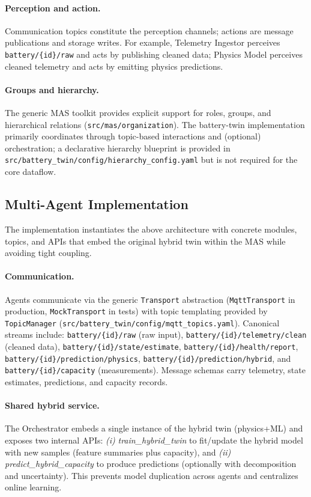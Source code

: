 \paragraph{Perception and action.} Communication topics constitute the perception channels; actions are message publications and storage writes. For example, Telemetry Ingestor perceives \texttt{battery/\{id\}/raw} and acts by publishing cleaned data; Physics Model perceives cleaned telemetry and acts by emitting physics predictions.

\paragraph{Groups and hierarchy.} The generic MAS toolkit provides explicit support for roles, groups, and hierarchical relations (\texttt{src/mas/organization}). The battery-twin implementation primarily coordinates through topic-based interactions and (optional) orchestration; a declarative hierarchy blueprint is provided in \texttt{src/battery\_twin/config/hierarchy\_config.yaml} but is not required for the core dataflow.



\subsection{Multi-Agent Implementation}

The implementation instantiates the above architecture with concrete modules, topics, and APIs that embed the original hybrid twin within the MAS while avoiding tight coupling.

\paragraph{Communication.} Agents communicate via the generic \texttt{Transport} abstraction (\texttt{MqttTransport} in production, \texttt{MockTransport} in tests) with topic templating provided by \texttt{TopicManager} (\texttt{src/battery\_twin/config/mqtt\_topics.yaml}). Canonical streams include: \texttt{battery/\{id\}/raw} (raw input), \texttt{battery/\{id\}/telemetry/clean} (cleaned data), \texttt{battery/\{id\}/state/estimate}, \texttt{battery/\{id\}/health/report}, \texttt{battery/\{id\}/prediction/physics}, \texttt{battery/\{id\}/prediction/hybrid}, and \texttt{battery/\{id\}/capacity} (measurements). Message schemas carry telemetry, state estimates, predictions, and capacity records.

\paragraph{Shared hybrid service.} The Orchestrator embeds a single instance of the hybrid twin (physics+ML) and exposes two internal APIs: \textit{(i)} \emph{train\_hybrid\_twin} to fit/update the hybrid model with new samples (feature summaries plus capacity), and \textit{(ii)} \emph{predict\_hybrid\_capacity} to produce predictions (optionally with decomposition and uncertainty). This prevents model duplication across agents and centralizes online learning.

